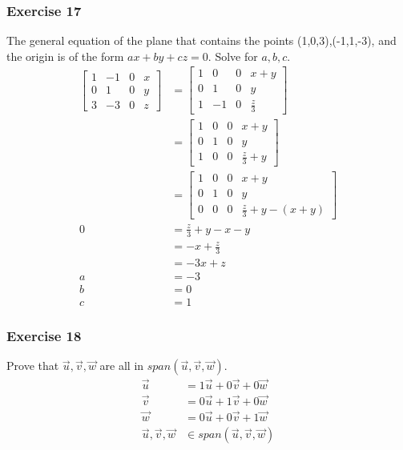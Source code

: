 \documentclass{math}
\begin{document}
\subsubsection*{Exercise 17}
The general equation of the plane that contains the points (1,0,3),(-1,1,-3),
and the origin is of the form \( ax+by+cz = 0 \). Solve for \( a, b, c \).
\begin{align*}
  \begin{bmatrix}
    1 & -1 & 0 & x \\
    0 & 1 & 0 & y \\
    3 & -3 & 0 & z
  \end{bmatrix} &= \begin{bmatrix}
    1 & 0 & 0 & x+y \\
    0 & 1 & 0 & y \\
    1 & -1 & 0 & \frac{z}{3}
  \end{bmatrix} \\
  &= \begin{bmatrix}
    1 & 0 & 0 & x+y \\
    0 & 1 & 0 & y \\
    1 & 0 & 0 & \frac{z}{3}+y
  \end{bmatrix} \\
  &= \begin{bmatrix}
    1 & 0 & 0 & x+y \\
    0 & 1 & 0 & y \\
    0 & 0 & 0 & \frac{z}{3}+y-(x+y)
  \end{bmatrix} \\
  0 &= \frac{z}{3}+y-x-y \\
  &= -x+\frac{z}{3} \\
  &= -3x+z \\
  a &= -3 \\
  b &= 0 \\
  c &= 1
\end{align*}

\subsubsection*{Exercise 18}
Prove that \( \vec{u},\vec{v},\vec{w} \) are all in
\( span(\vec{u},\vec{v},\vec{w}) \).
\begin{align*}
  \vec{u} &= 1\vec{u}+0\vec{v}+0\vec{w} \\
  \vec{v} &= 0\vec{u}+1\vec{v}+0\vec{w} \\
  \vec{w} &= 0\vec{u}+0\vec{v}+1\vec{w} \\
  \vec{u},\vec{v},\vec{w} &\in span(\vec{u},\vec{v},\vec{w})
\end{align*}
\end{document}
